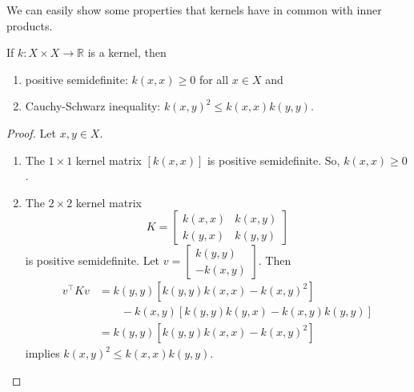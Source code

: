 We can easily show some properties that kernels have in common with inner products.

\begin{lemma}
    \label{lem:properties-of-kernels}
    If \(k : X \times X \to \mathbb{R}\) is a kernel, then
    \begin{enumerate}
        \item positive semidefinite: \(k(x,x) \geq 0\) for all \(x \in X\) and
        \item Cauchy-Schwarz inequality: \(k(x,y)^2 \leq k(x,x) k(y,y)\).
    \end{enumerate}
\end{lemma}

\begin{proof}
    Let \(x,y \in X\).
    \begin{enumerate}
        \item The \(1 \times 1\) kernel matrix \([k(x,x)]\) is positive semidefinite.
        So, \(k(x,x) \geq 0\).
        \item The \(2 \times 2\) kernel matrix
        \begin{equation}
            K = \begin{bmatrix}
                k(x,x) & k(x,y) \\ k(y,x) & k(y,y)
            \end{bmatrix}
        \end{equation}
        is positive semidefinite.
        Let \(v = \begin{bmatrix}
            k(y,y) \\ -k(x,y)
        \end{bmatrix}\).
        Then
        \begin{equation}
            \begin{aligned}
                v^\top K v
                &= k(y,y) \left[
                    k(y,y) k(x,x) - k(x,y)^2
                \right]\\
                &\qquad - k(x,y) \left[
                    k(y,y) k(y,x) - k(x,y) k(y,y)
                \right]\\
                &= k(y,y) \left[
                    k(y,y) k(x,x) - k(x,y)^2
                \right]
            \end{aligned}
        \end{equation}
        implies \(k(x,y)^2 \leq k(x,x) k(y,y)\).
        \qedhere
    \end{enumerate}
\end{proof}

